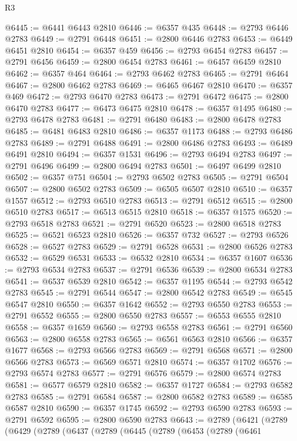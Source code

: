 \begin{lexlean}{R3}
\begin{coremodule}
@6445 := @6441 @6443 @2810
@6446 := @6357 @435
@6448 := @2793 @6446 @2783
@6449 := @2791 @6448
@6451 := @2800 @6446 @2783
@6453 := @6449 @6451 @2810
@6454 := @6357 @459
@6456 := @2793 @6454 @2783
@6457 := @2791 @6456
@6459 := @2800 @6454 @2783
@6461 := @6457 @6459 @2810
@6462 := @6357 @464
@6464 := @2793 @6462 @2783
@6465 := @2791 @6464
@6467 := @2800 @6462 @2783
@6469 := @6465 @6467 @2810
@6470 := @6357 @469
@6472 := @2793 @6470 @2783
@6473 := @2791 @6472
@6475 := @2800 @6470 @2783
@6477 := @6473 @6475 @2810
@6478 := @6357 @1495
@6480 := @2793 @6478 @2783
@6481 := @2791 @6480
@6483 := @2800 @6478 @2783
@6485 := @6481 @6483 @2810
@6486 := @6357 @1173
@6488 := @2793 @6486 @2783
@6489 := @2791 @6488
@6491 := @2800 @6486 @2783
@6493 := @6489 @6491 @2810
@6494 := @6357 @1531
@6496 := @2793 @6494 @2783
@6497 := @2791 @6496
@6499 := @2800 @6494 @2783
@6501 := @6497 @6499 @2810
@6502 := @6357 @751
@6504 := @2793 @6502 @2783
@6505 := @2791 @6504
@6507 := @2800 @6502 @2783
@6509 := @6505 @6507 @2810
@6510 := @6357 @1557
@6512 := @2793 @6510 @2783
@6513 := @2791 @6512
@6515 := @2800 @6510 @2783
@6517 := @6513 @6515 @2810
@6518 := @6357 @1575
@6520 := @2793 @6518 @2783
@6521 := @2791 @6520
@6523 := @2800 @6518 @2783
@6525 := @6521 @6523 @2810
@6526 := @6357 @732
@6527 := @2793 @6526
@6528 := @6527 @2783
@6529 := @2791 @6528
@6531 := @2800 @6526 @2783
@6532 := @6529 @6531
@6533 := @6532 @2810
@6534 := @6357 @1607
@6536 := @2793 @6534 @2783
@6537 := @2791 @6536
@6539 := @2800 @6534 @2783
@6541 := @6537 @6539 @2810
@6542 := @6357 @1195
@6544 := @2793 @6542 @2783
@6545 := @2791 @6544
@6547 := @2800 @6542 @2783
@6549 := @6545 @6547 @2810
@6550 := @6357 @1642
@6552 := @2793 @6550 @2783
@6553 := @2791 @6552
@6555 := @2800 @6550 @2783
@6557 := @6553 @6555 @2810
@6558 := @6357 @1659
@6560 := @2793 @6558 @2783
@6561 := @2791 @6560
@6563 := @2800 @6558 @2783
@6565 := @6561 @6563 @2810
@6566 := @6357 @1677
@6568 := @2793 @6566 @2783
@6569 := @2791 @6568
@6571 := @2800 @6566 @2783
@6573 := @6569 @6571 @2810
@6574 := @6357 @1702
@6576 := @2793 @6574 @2783
@6577 := @2791 @6576
@6579 := @2800 @6574 @2783
@6581 := @6577 @6579 @2810
@6582 := @6357 @1727
@6584 := @2793 @6582 @2783
@6585 := @2791 @6584
@6587 := @2800 @6582 @2783
@6589 := @6585 @6587 @2810
@6590 := @6357 @1745
@6592 := @2793 @6590 @2783
@6593 := @2791 @6592
@6595 := @2800 @6590 @2783
@6643 := @2789
    (@6421
      (@2789
        (@6429
          (@2789
            (@6437
              (@2789
                (@6445
                  (@2789
                    (@6453
                      (@2789
                        (@6461

\end{coremodule}
\end{lexlean}
